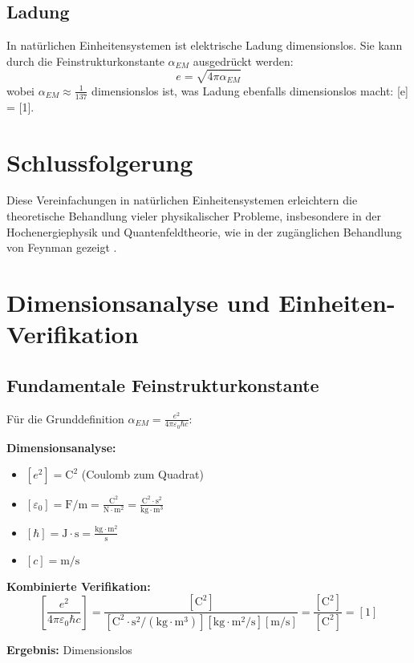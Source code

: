 \documentclass[12pt,a4paper]{article}
\begin{document}
	\subsection{Ladung}
	In natürlichen Einheitensystemen ist elektrische Ladung dimensionslos. Sie kann durch die Feinstrukturkonstante $\alpha_{EM}$ ausgedrückt werden:
	\begin{equation}
		e = \sqrt{4\pi\alpha_{EM}}
	\end{equation}
	wobei $\alpha_{EM} \approx \frac{1}{137}$ dimensionslos ist, was Ladung ebenfalls dimensionslos macht: [e] = [1].
	
	\section{Schlussfolgerung}
	Diese Vereinfachungen in natürlichen Einheitensystemen erleichtern die theoretische Behandlung vieler physikalischer Probleme, insbesondere in der Hochenergiephysik und Quantenfeldtheorie, wie in der zugänglichen Behandlung von Feynman gezeigt \cite{Feynman2006}.
	
	
	\section{Dimensionsanalyse und Einheiten-Verifikation}
	
	\subsection{Fundamentale Feinstrukturkonstante}
	
	Für die Grunddefinition $\alpha_{EM} = \frac{e^2}{4\pi\varepsilon_0\hbar c}$:
	
	\begin{tcolorbox}[colback=blue!5!white,colframe=blue!75!black,title=Einheiten-Überprüfung: Feinstrukturkonstante]
		\textbf{Dimensionsanalyse:}
		\begin{itemize}
			\item $[e^2] = \text{C}^2$ (Coulomb zum Quadrat)
			\item $[\varepsilon_0] = \text{F/m} = \frac{\text{C}^2}{\text{N}\cdot\text{m}^2} = \frac{\text{C}^2\cdot\text{s}^2}{\text{kg}\cdot\text{m}^3}$
			\item $[\hbar] = \text{J}\cdot\text{s} = \frac{\text{kg}\cdot\text{m}^2}{\text{s}}$
			\item $[c] = \text{m/s}$
		\end{itemize}
		
		\textbf{Kombinierte Verifikation:}
		$$\left[\frac{e^2}{4\pi\varepsilon_0\hbar c}\right] = \frac{[\text{C}^2]}{[\text{C}^2\cdot\text{s}^2/(\text{kg}\cdot\text{m}^3)][\text{kg}\cdot\text{m}^2/\text{s}][\text{m/s}]} = \frac{[\text{C}^2]}{[\text{C}^2]} = [1]$$
		
		\textbf{Ergebnis:} Dimensionslos \checkmark
	\end{tcolorbox}
	
\end{document}
